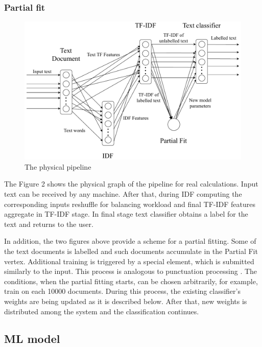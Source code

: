 \subsubsection{Partial fit}

\begin{figure}[htbp]
  \centering
  \includegraphics[scale=0.38]{pics/physical-graph}
  \caption{The physical pipeline}
  \label {physical graph}
\end{figure}

The Figure 2 shows the physical graph of the pipeline for real calculations. Input text can be received by any machine. After that, during IDF computing the corresponding inputs reshuffle for balancing workload and final TF-IDF features aggregate in TF-IDF stage. In final stage text classifier obtains a label for the text and returns to the user.

In addition, the two figures above provide a scheme for a partial fitting. Some of the text documents is labelled and such documents accumulate in the Partial Fit vertex. Additional training is triggered by a special element, which is submitted similarly to the input. This process is analogous to punctuation processing \cite{tucker2003exploiting}. The conditions, when the partial fitting starts, can be chosen arbitrarily, for example, train on each 10000 documents. During this process, the existing classifier's weights are being updated as it is described below. After that, new weights is distributed among the system and the classification continues. 

\subsection{ML model}


